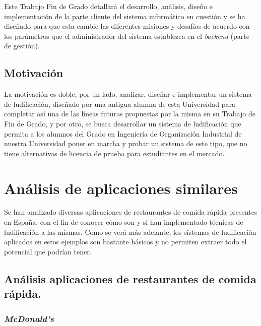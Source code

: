 \documentclass[twoside]{report}
\begin{document}
Este Trabajo Fin de Grado detallará el desarrollo, análisis, diseño e implementación de la parte cliente del sistema informático en cuestión y se ha diseñado para que esta cambie las diferentes misiones y desafíos de acuerdo con los parámetros que el administrador del sistema establezca en el \textit{backend} (parte de gestión).

\subsection{Motivación}

La motivación es doble, por un lado, analizar, diseñar e implementar un sistema de ludificación, diseñado por una antigua alumna de esta Universidad para completar así una de las líneas futuras propuestas por la misma en su Trabajo de Fin de Grado, y por otro, se busca desarrollar un sistema de ludificación que permita a los alumnos del Grado en Ingeniería de Organización Industrial de nuestra Universidad poner en marcha y probar un sistema de este tipo, que no tiene alternativas de licencia de prueba para estudiantes en el mercado.

\clearpage

\section{Análisis de aplicaciones similares}

Se han analizado diversas aplicaciones de restaurantes de comida rápida presentes en España, con el fin de conocer cómo son y si han implementado técnicas de ludificación a las mismas. Como se verá más adelante, los sistemas de ludificación aplicados en estos ejemplos son bastante básicos y no permiten extraer todo el potencial que podrían tener.

\subsection{Análisis aplicaciones de restaurantes de comida rápida.}
\subsubsection{\textit{McDonald's}}
\end{document}
